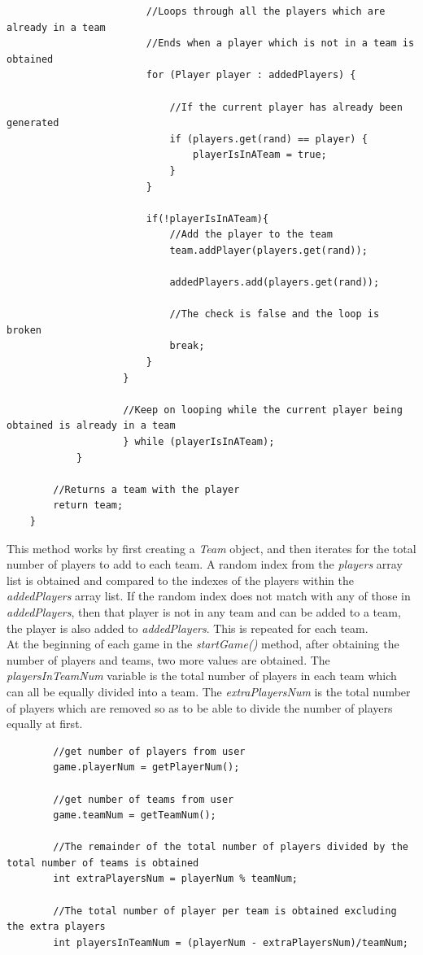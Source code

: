 \documentclass[a4paper,12pt]{extarticle}
\begin{document}
\begin{lstlisting}
                        //Loops through all the players which are already in a team
                        //Ends when a player which is not in a team is obtained
                        for (Player player : addedPlayers) {

                            //If the current player has already been generated
                            if (players.get(rand) == player) {
                                playerIsInATeam = true;
                            }
                        }

                        if(!playerIsInATeam){
                            //Add the player to the team
                            team.addPlayer(players.get(rand));

                            addedPlayers.add(players.get(rand));

                            //The check is false and the loop is broken
                            break;
                        }
                    }

                    //Keep on looping while the current player being obtained is already in a team
                    } while (playerIsInATeam);
            }

        //Returns a team with the player
        return team;
    }
\end{lstlisting}
\vspace{4mm}

\noindent This method works by first creating a \textit{Team} object, and then iterates for the total number of players to add to each team. A random index from the \textit{players} array list is obtained and compared to the indexes of the players within the \textit{addedPlayers} array list. If the random index does not match with any of those in \textit{addedPlayers}, then that player is not in any team and can be added to a team, the player is also added to \textit{addedPlayers}. This is repeated for each team.\\

\noindent At the beginning of each game in the \textit{startGame()} method, after obtaining the number of players and teams, two more values are obtained. The \textit{playersInTeamNum} variable is the total number of players in each team which can all be equally divided into a team. The \textit{extraPlayersNum} is the total number of players which are removed so as to be able to divide the number of players equally at first. 

\begin{lstlisting}
        //get number of players from user
        game.playerNum = getPlayerNum();

        //get number of teams from user
        game.teamNum = getTeamNum();

        //The remainder of the total number of players divided by the total number of teams is obtained
        int extraPlayersNum = playerNum % teamNum;

        //The total number of player per team is obtained excluding the extra players
        int playersInTeamNum = (playerNum - extraPlayersNum)/teamNum;


\end{lstlisting}
\end{document}
